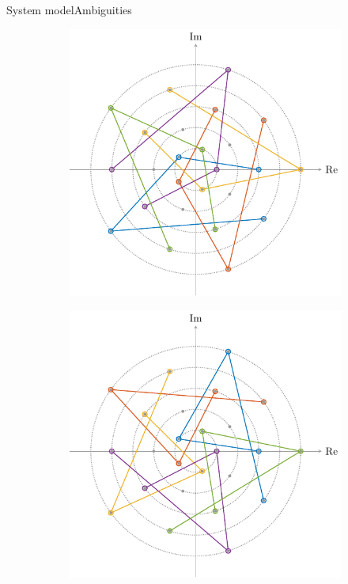 \documentclass[en]{sdqbeamer}
\begin{document}
\begin{frame}{System model}{Ambiguities}
\begin{figure}[htb]
     \centering
     \begin{subfigure}[b]{0.4\textwidth}
         \centering
         \includegraphics[width=\textwidth]{Eq_class_construction_10.pdf}
     \end{subfigure}
     \hspace{10mm}
     \begin{subfigure}[b]{0.4\textwidth}
         \centering
         \includegraphics[width=\textwidth]{Eq_class_construction_11.pdf}
     \end{subfigure}
\end{figure}

\end{frame}
\end{document}
